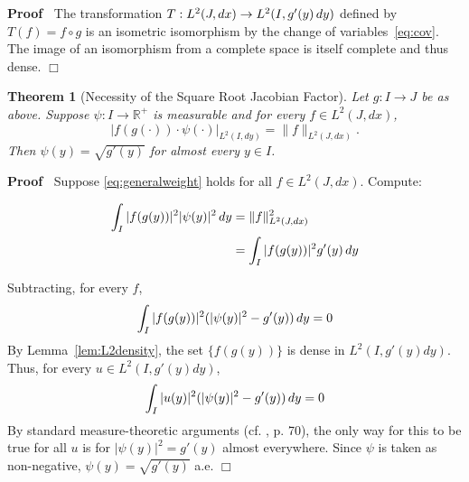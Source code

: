\documentclass{article}
\newenvironment{proof}{\noindent\textbf{Proof\ }}{\hspace*{\fill}$\Box$\medskip}
\newtheorem{theorem}{Theorem}
\begin{document}
\begin{proof}
  The transformation $T : L^2 (J, dx) \to L^2 (I, g' (y) \hspace{0.17em} dy)$
  defined by $T (f) = f \circ g$ is an isometric isomorphism by the change of
  variables~\eqref{eq:cov}. The image of an isomorphism from a complete space
  is itself complete and thus dense.
\end{proof}

\begin{theorem}
  [Necessity of the Square Root Jacobian Factor]\label{thm:necessity} Let $g :
  I \to J$ be as above. Suppose $\psi : I \to \mathbb{R}^+$ is measurable and
  for every $f \in L^2 (J, dx)$,
  \begin{equation}
    \label{eq:generalweight} | f (g (\cdot)) \cdot \psi (\cdot) |_{L^2 (I,
    dy)} = \|f\|_{L^2 (J, dx)} .
  \end{equation}
  Then $\psi (y) = \sqrt{g' (y)}$ for almost every $y \in I$.
\end{theorem}

\begin{proof}
  Suppose \eqref{eq:generalweight} holds for all $f \in L^2 (J, dx)$. Compute:
  
  \begin{align}
    \int_I |f (g (y)) |^2 | \psi (y) |^2  \hspace{0.17em} dy & = \|f\|_{L^2
    (J, dx)}^2 \\
    & = \int_I |f (g (y)) |^2 g' (y)  \hspace{0.17em} dy  \label{eq:proofcov}
  \end{align}
  
  Subtracting, for every $f$,
  \begin{equation}
    \int_I |f (g (y)) |^2  (| \psi (y) |^2 - g' (y))  \hspace{0.17em} dy = 0
  \end{equation}
  By Lemma~\ref{lem:L2density}, the set $\{f (g (y))\}$ is dense in $L^2 (I,
  g' (y) dy)$. Thus, for every $u \in L^2 (I, g' (y) dy)$,
  \begin{equation}
    \int_I |u (y) |^2  (| \psi (y) |^2 - g' (y))  \hspace{0.17em} dy = 0
  \end{equation}
  By standard measure-theoretic arguments (cf. {\cite{Folland}}, p. 70), the
  only way for this to be true for all $u$ is for $| \psi (y) |^2 = g' (y)$
  almost everywhere. Since $\psi$ is taken as non-negative, $\psi (y) =
  \sqrt{g' (y)}$ a.e.
\end{proof}
\end{document}
